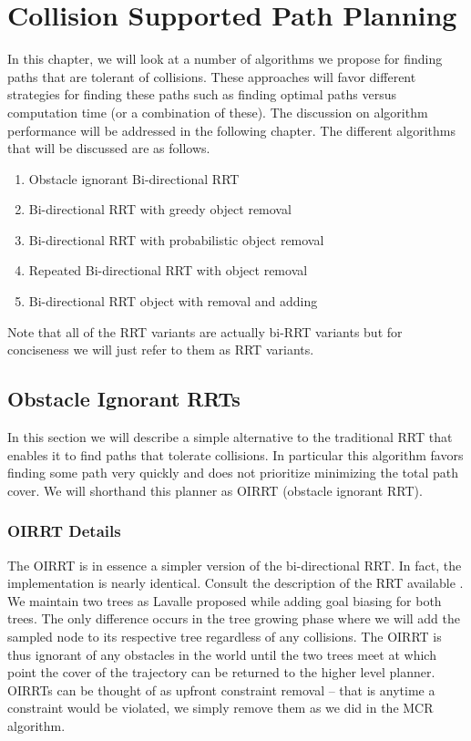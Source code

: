 \chapter{Collision Supported Path Planning}
In this chapter, we will look at a number of algorithms we propose for finding paths that are tolerant of collisions. These approaches will favor different strategies for finding these paths such as finding optimal paths versus computation time (or a combination of these). The discussion on algorithm performance will be addressed in the following chapter. The different algorithms that will be discussed are as follows.

\begin{enumerate}
\item Obstacle ignorant Bi-directional RRT
\item Bi-directional RRT with greedy object removal
\item Bi-directional RRT with probabilistic object removal
\item Repeated Bi-directional RRT with object removal
\item Bi-directional RRT object with removal and adding
\end{enumerate}

Note that all of the RRT variants are actually bi-RRT variants but for conciseness we will just refer to them as RRT variants.

\section{Obstacle Ignorant RRTs}
In this section we will describe a simple alternative to the traditional RRT that enables it to find paths that tolerate collisions. In particular this algorithm favors finding some path very quickly and does not prioritize minimizing the total path cover. We will shorthand this planner as OIRRT (obstacle ignorant RRT).

\subsection{OIRRT Details}
The OIRRT is in essence a simpler version of the bi-directional RRT. In fact, the implementation is nearly identical. Consult the description of the RRT available . We maintain two trees as Lavalle proposed while adding goal biasing for both trees. The only difference occurs in the tree growing phase where we will add the sampled node to its respective tree regardless of any collisions. The OIRRT is thus ignorant of any obstacles in the world until the two trees meet at which point the cover of the trajectory can be returned to the higher level planner. OIRRTs can be thought of as upfront constraint removal -- that is anytime a constraint would be violated, we simply remove them as we did in the MCR algorithm. 


